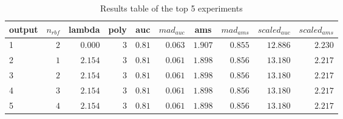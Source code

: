 \begin{table}[!tbp]
\caption{Results table of the top 5 experiments\label{output}} 
\begin{center}
\begin{tabular}{lrrrrrrrrr}
\hline\hline
\multicolumn{1}{l}{output}&\multicolumn{1}{c}{$n_{rbf}$}&\multicolumn{1}{c}{lambda}&\multicolumn{1}{c}{poly}&\multicolumn{1}{c}{auc}&\multicolumn{1}{c}{$mad_{auc}$}&\multicolumn{1}{c}{ams}&\multicolumn{1}{c}{$mad_{ams}$}&\multicolumn{1}{c}{$scaled_{auc}$}&\multicolumn{1}{c}{$scaled_{ams}$}\tabularnewline
\hline
1&$2$&$0.000$&$3$&$0.81$&$0.063$&$1.907$&$0.855$&$12.886$&$2.230$\tabularnewline
2&$1$&$2.154$&$3$&$0.81$&$0.061$&$1.898$&$0.856$&$13.180$&$2.217$\tabularnewline
3&$2$&$2.154$&$3$&$0.81$&$0.061$&$1.898$&$0.856$&$13.180$&$2.217$\tabularnewline
4&$3$&$2.154$&$3$&$0.81$&$0.061$&$1.898$&$0.856$&$13.180$&$2.217$\tabularnewline
5&$4$&$2.154$&$3$&$0.81$&$0.061$&$1.898$&$0.856$&$13.180$&$2.217$\tabularnewline
\hline
\end{tabular}\end{center}
\end{table}
